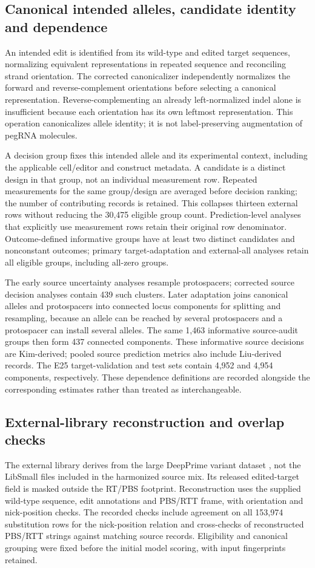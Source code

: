 \subsection{Canonical intended alleles, candidate identity and dependence}
An intended edit is identified from its wild-type and edited target sequences, normalizing equivalent representations in repeated sequence and reconciling strand orientation. The corrected canonicalizer independently normalizes the forward and reverse-complement orientations before selecting a canonical representation. Reverse-complementing an already left-normalized indel alone is insufficient because each orientation has its own leftmost representation. This operation canonicalizes allele identity; it is not label-preserving augmentation of pegRNA molecules.

A decision group fixes this intended allele and its experimental context, including the applicable cell/editor and construct metadata. A candidate is a distinct design in that group, not an individual measurement row. Repeated measurements for the same group/design are averaged before decision ranking; the number of contributing records is retained. This collapses thirteen external rows without reducing the 30,475 eligible group count. Prediction-level analyses that explicitly use measurement rows retain their original row denominator. Outcome-defined informative groups have at least two distinct candidates and nonconstant outcomes; primary target-adaptation and external-all analyses retain all eligible groups, including all-zero groups.

The early source uncertainty analyses resample protospacers; corrected source decision analyses contain 439 such clusters. Later adaptation joins canonical alleles and protospacers into connected locus components for splitting and resampling, because an allele can be reached by several protospacers and a protospacer can install several alleles. The same 1,463 informative source-audit groups then form 437 connected components. These informative source decisions are Kim-derived; pooled source prediction metrics also include Liu-derived records. The E25 target-validation and test sets contain 4,952 and 4,954 components, respectively. These dependence definitions are recorded alongside the corresponding estimates rather than treated as interchangeable.

\subsection{External-library reconstruction and overlap checks}
The external library derives from the large DeepPrime variant dataset \citep{yu2023}, not the LibSmall files included in the harmonized source mix. Its released edited-target field is masked outside the RT/PBS footprint. Reconstruction uses the supplied wild-type sequence, edit annotations and PBS/RTT frame, with orientation and nick-position checks. The recorded checks include agreement on all 153,974 substitution rows for the nick-position relation and cross-checks of reconstructed PBS/RTT strings against matching source records. Eligibility and canonical grouping were fixed before the initial model scoring, with input fingerprints retained.

